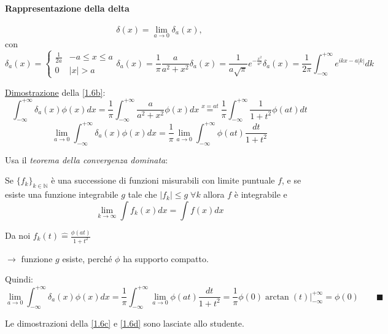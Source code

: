 \documentclass[a4paper,11pt]{report}
\begin{document}
\paragraph{Rappresentazione della delta}
\[
\delta(x) = \lim_{a\to 0} \delta_a(x),
\]
con 
\begin{subequations}
\begin{equation}
\delta_a(x)=\begin{cases}
\frac{1}{2a} & -a \leq x \leq a \\
0 & |x| > a
\end{cases}
\label{1.6a}
\end{equation}
\begin{equation}
\delta_a(x) = \frac{1}{\pi}\frac{a}{a^2+x^2}
\label{1.6b}
\end{equation}
\begin{equation}
\delta_a(x) = \frac{1}{a\sqrt{\pi}} e^{-\frac{x^2}{a^2}}
\label{1.6c}
\end{equation}
\begin{equation}
\delta_a(x) = \frac{1}{2\pi} \int_{-\infty}^{+\infty} e^{ikx-a|k|}dk
\label{1.6d}
\end{equation}
\end{subequations}

\underline{Dimostrazione} della \eqref{1.6b}:
\[
\int_{-\infty}^{+\infty} \delta_a(x)\phi(x)dx=\frac{1}{\pi}\int_{-\infty}^{+\infty}\frac{a}{a^2+x^2}\phi(x)dx \overset{x=at}{=} \frac{1}{\pi}\int_{-\infty}^{+\infty}\frac{1}{1+t^2}\phi(at)dt
\]
\[
\lim_{a\to 0} \int_{-\infty}^{+\infty}\delta_a(x)\phi(x)dx=\frac{1}{\pi}\lim_{a\to 0}\int_{-\infty}^{+\infty}\phi(at)\frac{dt}{1+t^2}
\]

Usa il \emph{teorema della convergenza dominata}:

Se $\{f_k\}_{k\in\mathbb{N}}$ \`e una successione di funzioni misurabili con limite puntuale $f$, e se esiste una funzione integrabile $g$ tale che $|f_k|\leq g \; \forall k$ allora $f$ \`e integrabile e
\[
\lim_{k\to \infty}\int f_k(x) dx = \int f(x) dx
\]

Da noi $f_k(t)\hat{=}\frac{\phi(at)}{1+t^2}$

$\rightarrow$ funzione $g$ esiste, perch\'e $\phi$ ha supporto compatto.

Quindi:
\[
\lim_{a\to 0}\int_{-\infty}^{+\infty}\delta_a(x)\phi(x)dx=\frac{1}{\pi}\int_{-\infty}^{+\infty} \lim_{a\to 0} \phi(at) \frac{dt}{1+t^2}=\frac{1}{\pi} \phi(0) \arctan{(t)}\Big|_{-\infty}^{+\infty}=\phi(0) \qquad \blacksquare
\]

Le dimostrazioni della \eqref{1.6c} e \eqref{1.6d} sono lasciate allo studente.
\end{document}
